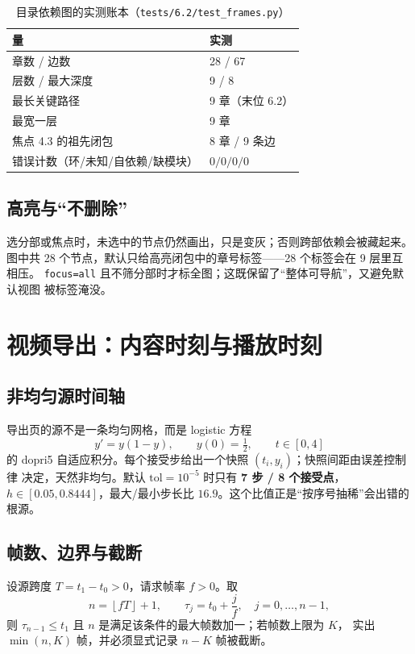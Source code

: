 \begin{table}[htbp]
\centering
\caption{目录依赖图的实测账本（\texttt{tests/6.2/test\_frames.py}）}
\begin{tabular}{ll}
\toprule
量 & 实测 \\
\midrule
章数 / 边数 & 28 / 67 \\
层数 / 最大深度 & 9 / 8 \\
最长关键路径 & 9 章（末位 6.2）\\
最宽一层 & 9 章 \\
焦点 4.3 的祖先闭包 & 8 章 / 9 条边 \\
错误计数（环/未知/自依赖/缺模块） & $0/0/0/0$ \\
\bottomrule
\end{tabular}
\end{table}

\subsection{高亮与“不删除”}

选分部或焦点时，未选中的节点仍然画出，只是变灰；否则跨部依赖会被藏起来。
图中共 28 个节点，默认只给高亮闭包中的章号标签——28 个标签会在 9 层里互相压。
\texttt{focus=all} 且不筛分部时才标全图；这既保留了“整体可导航”，又避免默认视图
被标签淹没。

\section{视频导出：内容时刻与播放时刻}\label{sec:export}

\subsection{非均匀源时间轴}

导出页的源不是一条均匀网格，而是 logistic 方程
\[
  y'=y(1-y),\qquad y(0)=\tfrac12,\qquad t\in[0,4]
\]
的 dopri5 自适应积分。每个接受步给出一个快照 $(t_i,y_i)$；快照间距由误差控制律
决定，天然非均匀。默认 $\mathrm{tol}=10^{-5}$ 时只有 \textbf{7 步 / 8 个接受点}，
$h\in[0.05,0.8444]$，最大/最小步长比 $16.9$。这个比值正是“按序号抽稀”会出错的
根源。

\subsection{帧数、边界与截断}

\begin{theorem}[导出帧数]\label{thm:frames}
设源跨度 $T=t_1-t_0>0$，请求帧率 $f>0$。取
\[
  n=\left\lfloor fT\right\rfloor+1,\qquad
  \tau_j=t_0+\frac{j}{f},\quad j=0,\dots,n-1,
\]
则 $\tau_{n-1}\le t_1$ 且 $n$ 是满足该条件的最大帧数加一；若帧数上限为 $K$，
实出 $\min(n,K)$ 帧，并必须显式记录 $n-K$ 帧被截断。
\end{theorem}

